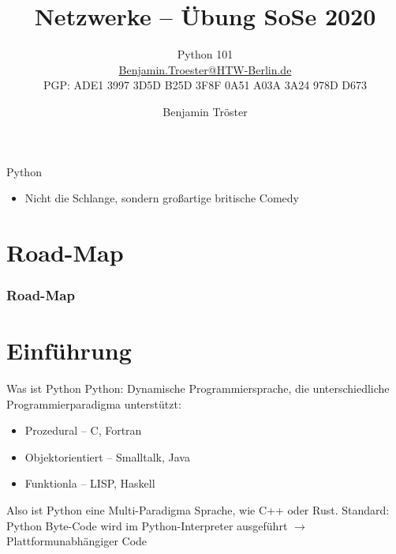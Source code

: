\documentclass[xcolor=dvipsnames,aspectratio=169]{beamer}
\begin{document}

\title{Netzwerke -- Übung SoSe 2020}
\subtitle{Python 101\\
\href{mailto:Benjamin.Troester@HTW-Berlin.de}{Benjamin.Troester@HTW-Berlin.de}\\
		PGP: ADE1 3997 3D5D B25D 3F8F 0A51 A03A 3A24 978D D673 }

\author{Benjamin Tröster}

\date{}

\begin{frame}
\titlepage
\end{frame}

\begin{frame}{Python}
	\begin{itemize}
		\item Nicht die Schlange, sondern großartige britische Comedy
	\end{itemize}
\end{frame}

\section*{Road-Map}
\begin{frame}
\frametitle{Road-Map}
\begin{multicols}{2}
  \tableofcontents
\end{multicols}
\end{frame}


\section{Einführung}
\begin{frame}{Was ist Python}
Python: Dynamische Programmiersprache, die unterschiedliche Programmierparadigma unterstützt:
\begin{itemize}
	\item Prozedural -- C, Fortran
	\item Objektorientiert -- Smalltalk, Java
	\item Funktionla -- LISP, Haskell
\end{itemize}
Also ist Python eine Multi-Paradigma Sprache, wie C++ oder Rust.
Standard: Python Byte-Code wird im Python-Interpreter ausgeführt $\rightarrow$ 
Plattformunabhängiger Code
\end{frame}
\end{document}
